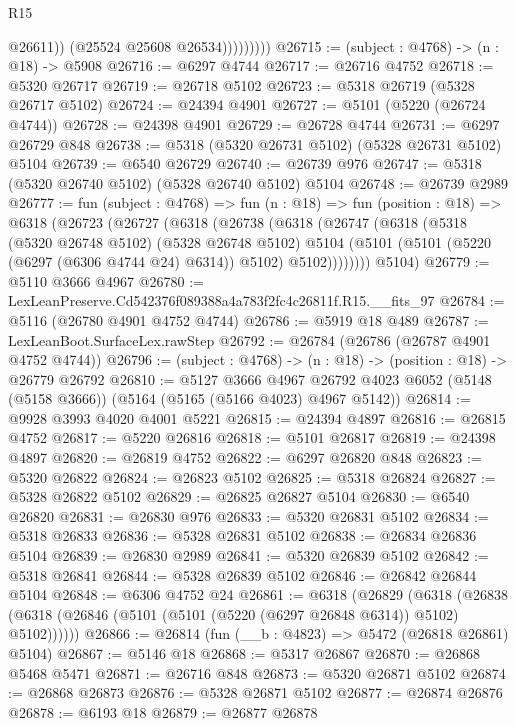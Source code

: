 \begin{lexlean}{R15}
\begin{coremodule}
{{{{{{{{{{{                        @26611))
                    (@25524 @25608 @26534)))))))))
@26715 := (subject : @4768) -> (n : @18) -> @5908
@26716 := @6297 @4744
@26717 := @26716 @4752
@26718 := @5320 @26717
@26719 := @26718 @5102
@26723 := @5318 @26719 (@5328 @26717 @5102)
@26724 := @24394 @4901
@26727 := @5101 (@5220 (@26724 @4744))
@26728 := @24398 @4901
@26729 := @26728 @4744
@26731 := @6297 @26729 @848
@26738 := @5318 (@5320 @26731 @5102) (@5328 @26731 @5102) @5104
@26739 := @6540 @26729
@26740 := @26739 @976
@26747 := @5318 (@5320 @26740 @5102) (@5328 @26740 @5102) @5104
@26748 := @26739 @2989
@26777 := fun (subject : @4768) =>
  fun (n : @18) =>
  fun (position : @18) =>
  @6318
    (@26723
      (@26727
        (@6318
          (@26738
            (@6318
              (@26747
                (@6318
                  (@5318
                    (@5320 @26748 @5102)
                    (@5328 @26748 @5102)
                    @5104
                    (@5101 (@5101 (@5220 (@6297 (@6306 @4744 @24) @6314)) @5102) @5102))))))))
      @5104)
@26779 := @5110 @3666 @4967
@26780 := LexLeanPreserve.Cd542376f089388a4a783f2fc4c26811f.R15.__fits_97
@26784 := @5116 (@26780 @4901 @4752 @4744)
@26786 := @5919 @18 @489
@26787 := LexLeanBoot.SurfaceLex.rawStep
@26792 := @26784 (@26786 (@26787 @4901 @4752 @4744))
@26796 := (subject : @4768) -> (n : @18) -> (position : @18) -> @26779 @26792
@26810 := @5127
    @3666
    @4967
    @26792
    @4023
    @6052
    (@5148 (@5158 @3666))
    (@5164 (@5165 (@5166 @4023) @4967 @5142))
@26814 := @9928 @3993 @4020 @4001 @5221
@26815 := @24394 @4897
@26816 := @26815 @4752
@26817 := @5220 @26816
@26818 := @5101 @26817
@26819 := @24398 @4897
@26820 := @26819 @4752
@26822 := @6297 @26820 @848
@26823 := @5320 @26822
@26824 := @26823 @5102
@26825 := @5318 @26824
@26827 := @5328 @26822 @5102
@26829 := @26825 @26827 @5104
@26830 := @6540 @26820
@26831 := @26830 @976
@26833 := @5320 @26831 @5102
@26834 := @5318 @26833
@26836 := @5328 @26831 @5102
@26838 := @26834 @26836 @5104
@26839 := @26830 @2989
@26841 := @5320 @26839 @5102
@26842 := @5318 @26841
@26844 := @5328 @26839 @5102
@26846 := @26842 @26844 @5104
@26848 := @6306 @4752 @24
@26861 := @6318
    (@26829
      (@6318 (@26838 (@6318 (@26846 (@5101 (@5101 (@5220 (@6297 @26848 @6314)) @5102) @5102))))))
@26866 := @26814 (fun (__b : @4823) => @5472 (@26818 @26861) @5104)
@26867 := @5146 @18
@26868 := @5317 @26867
@26870 := @26868 @5468 @5471
@26871 := @26716 @848
@26873 := @5320 @26871 @5102
@26874 := @26868 @26873
@26876 := @5328 @26871 @5102
@26877 := @26874 @26876
@26878 := @6193 @18
@26879 := @26877 @26878
}}}}}}}}}}}
\end{coremodule}
\end{lexlean}
